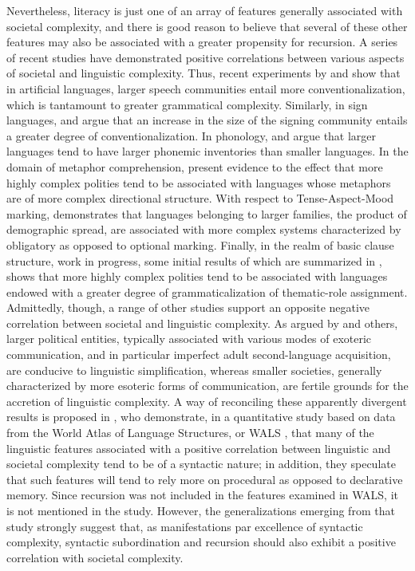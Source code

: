 \documentclass[output=paper]{langscibook}
\begin{document}
Nevertheless, literacy is just one of an array of features generally associated with societal complexity, and there is good reason to believe that several of these other features may also be associated with a greater propensity for recursion.  A series of recent studies have demonstrated positive correlations between various aspects of societal and linguistic complexity.  Thus, recent experiments by \citet{raviv2019larger,raviv2020role} and \citet{raviv2020language} show that in artificial languages, larger speech communities entail more conventionalization, which is tantamount to greater grammatical complexity. Similarly, in sign languages, \citet{meir2012influence} and \citet{ergin2020community} argue that an increase in the size of the signing community entails a greater degree of conventionalization.  In phonology, \citet{hay2007phoneme,atkinson2011phonemic,wichmann2011phonological} and \citet{nettle2012social} argue that larger languages tend to have larger phonemic inventories than smaller languages. In the domain of metaphor comprehension, \citet{gil2021metaphors} present evidence to the effect that more highly complex polities tend to be associated with languages whose metaphors are of more complex directional structure.  With respect to Tense-Aspect-Mood marking, \citet{gil2021tense} demonstrates that languages belonging to larger families, the product of demographic spread, are associated with more complex systems characterized by obligatory as opposed to optional marking.  Finally, in the realm of basic clause structure, work in progress, some initial results of which are summarized in \citet{gil2019grammar}, shows that more highly complex polities tend to be associated with languages endowed with a greater degree of grammaticalization of thematic-role assignment.  Admittedly, though, a range of other studies support an opposite negative correlation between societal and linguistic complexity.  As argued by \citet{mcwhorter2018creole,mcwhorter2005defining,mcwhorter2011linguistic,dahl2004growth,wray2007consequences,lupyan2010language,trudgill2011sociolinguistic} and others, larger political entities, typically associated with various modes of exoteric communication, and in particular imperfect adult second-language acquisition, are conducive to linguistic simplification, whereas smaller societies, generally characterized by more esoteric forms of communication, are fertile grounds for the accretion of linguistic complexity.  A way of reconciling these apparently divergent results is proposed in \citet{chen2023linguistic}, who demonstrate, in a quantitative study based on data from the World Atlas of Language Structures, or WALS \citep{haspelmath2005atlas}, that many of the linguistic features associated with a positive correlation between linguistic and societal complexity tend to be of a syntactic nature; in addition, they speculate that such features will tend to rely more on procedural as opposed to declarative memory. Since recursion was not included in the features examined in WALS, it is not mentioned in the \citet{chen2023linguistic} study.  However, the generalizations emerging from that study strongly suggest that, as manifestations par excellence of syntactic complexity, syntactic subordination and recursion should also exhibit a positive correlation with societal complexity.
\end{document}
